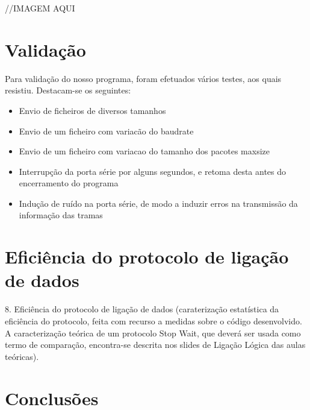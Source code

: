 \documentclass[article, a4paper, 11pt, oneside]{memoir}
\begin{document}
 //IMAGEM AQUI

\chapter[Validação][Validação]{Validação} \label{\thechapter}

Para validação do nosso programa, foram efetuados vários testes, aos quais resistiu. Destacam-se os seguintes:

\begin{itemize}
	\item Envio de ficheiros de diversos tamanhos
	\item Envio de um ficheiro com variacão do baudrate
	\item Envio de um ficheiro com variacao do tamanho dos pacotes max\textunderscore size
	\item Interrupção da porta série por alguns segundos, e retoma desta antes do encerramento do programa
	\item Indução de ruído na porta série, de modo a induzir erros na transmissão da informação das tramas
\end{itemize}

\chapter[Eficiência do protocolo de ligação de dados][Eficiência do protocolo de ligação de dados]{Eficiência do protocolo de ligação de dados} \label{\thechapter}

8. Eficiência do protocolo de ligação de dados (caraterização estatística da  eficiência do protocolo, feita com recurso a medidas sobre o código desenvolvido. 
A caracterização teórica de um protocolo Stop Wait, que 
   deverá ser usada como termo de comparação, encontra-se descrita nos slides de Ligação Lógica das aulas teóricas).


\chapter[Conclusões][Conclusões]{Conclusões} \label{\thechapter}
\end{document}
